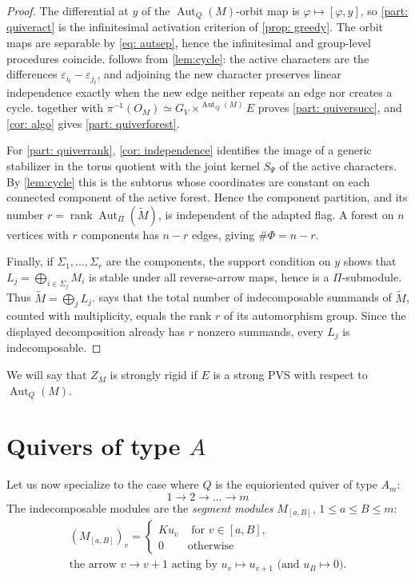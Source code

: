 \documentclass[12pt]{article}
\newcommand{\rk}{\operatorname{rank}}
\newcommand{\Aut}{\operatorname{Aut}}
\newcommand{\PVS}{PVS}
\begin{document}
\begin{proof}
The differential at $y$ of the $\Aut_Q(M)$-orbit map is
$\varphi\mapsto[\varphi,y]$, so \cref{part: quiveract} is the infinitesimal activation criterion of
\cref{prop: greedy}.  The orbit maps are separable by \cref{eq: autsep}, hence the infinitesimal and
group-level procedures coincide.   follows from \cref{lem:cycle}: the active characters
are the differences $\varepsilon_{i_t}-\varepsilon_{j_t}$, and adjoining the new
character preserves linear independence exactly when the new edge neither repeats an
edge nor creates a cycle.   together with
$\pi^{-1}(O_M)\simeq G_V\times^{\Aut_Q(M)}E$ proves \cref{part: quiversucc}, and \cref{cor: algo} gives
\cref{part: quiverforest}.

For \cref{part: quiverrank}, \cref{cor: independence} identifies the image of a generic stabilizer in the torus
quotient with the joint kernel $S_\Psi$ of the active characters.  By \cref{lem:cycle} this is
the subtorus whose coordinates are constant on each connected component of the active
forest.  Hence the component partition, and its number $r=\rk
\Aut_\Pi(\widetilde M)$, is independent of the adapted flag.  A forest on $n$ vertices
with $r$ components has $n-r$ edges, giving $\#\Phi=n-r$.

Finally, if $\Sigma_1,\dots,\Sigma_r$ are the components, the support condition on $y$
shows that $L_j=\bigoplus_{i\in\Sigma_j}M_i$ is stable under all reverse-arrow maps, hence
is a $\Pi$-submodule.  Thus $\widetilde M=\bigoplus_jL_j$.   says that the total
number of indecomposable summands of $\widetilde M$, counted with multiplicity, equals
the rank $r$ of its automorphism group.  Since the displayed decomposition already has
$r$ nonzero summands, every $L_j$ is indecomposable.
\end{proof}


We will say that $Z_M$ is strongly rigid if $E$ is a strong {\PVS} with respect to $\Aut_Q(M)$.

\section{Quivers of type \texorpdfstring{$A$}{A}} \label{sec: typeA}


Let us now specialize to the case where $Q$ is the equioriented quiver of type $A_m$:
\[
1\to2\to\dots\to m
\]
The indecomposable modules are the
\emph{segment modules} $M_{[a,B]}$, $1\le a\le B\le m$:
\begin{gather*}
(M_{[a,B]})_v=\begin{cases}Ku_v&\text{ for }v\in[a,B],\\0&\text{otherwise}\end{cases}\\
\text{the arrow $v\to v+1$ acting by $u_v\mapsto u_{v+1}$ (and $u_B\mapsto0$).}
\end{gather*}
\end{document}
